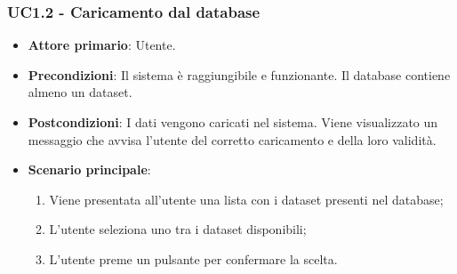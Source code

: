 \subsubsection{UC1.2 - Caricamento dal database}
\begin{itemize}
	\item \textbf{Attore primario}: Utente.
	\item \textbf{Precondizioni}: Il sistema è raggiungibile e funzionante. Il database contiene almeno un dataset.
	\item \textbf{Postcondizioni}: I dati vengono caricati nel sistema. Viene visualizzato un messaggio che avvisa l'utente del corretto caricamento e della loro validità.
	\item \textbf{Scenario principale}: 
	\begin{enumerate}
			\item Viene presentata all'utente una lista con i dataset presenti nel database;
			\item L'utente seleziona uno tra i dataset disponibili;
			\item L'utente preme un pulsante per confermare la scelta.
		\end{enumerate}
	
\end{itemize}